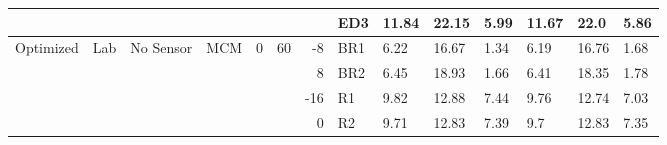 {\begin{minipage}{\linewidth}
\begin{tabular}{l|l|l|l|c|c|r|l|lll|lll}
                                              &                                          &                                           &                                           & \multicolumn{1}{l|}{}                      &                                                                                         & \multicolumn{1}{c|}{}                                                                          & ED3                                       & 11.84 & 22.15 & 5.99      & 11.67 & 22.0  & 5.86       \\
  \hline
  \multirow{64}{*}{Optimized}                 & \multirow{32}{*}{Lab}                    & \multirow{16}{*}{No Sensor}               & \multirow{8}{*}{MCM}                      & \multirow{16}{*}{0}                        & \multirow{32}{*}{60}                                                                    & -8                                                                                             & BR1                                       & 6.22  & 16.67 & 1.34      & 6.19  & 16.76 & 1.68       \\
                                              &                                          &                                           &                                           &                                            &                                                                                         & 8                                                                                              & BR2                                       & 6.45  & 18.93 & 1.66      & 6.41  & 18.35 & 1.78       \\
                                              &                                          &                                           &                                           &                                            &                                                                                         & -16                                                                                            & R1                                        & 9.82  & 12.88 & 7.44      & 9.76  & 12.74 & 7.03       \\
                                              &                                          &                                           &                                           &                                            &                                                                                         & 0                                                                                              & R2                                        & 9.71  & 12.83 & 7.39      & 9.7   & 12.83 & 7.35       \\

\end{tabular}
\end{minipage}}
